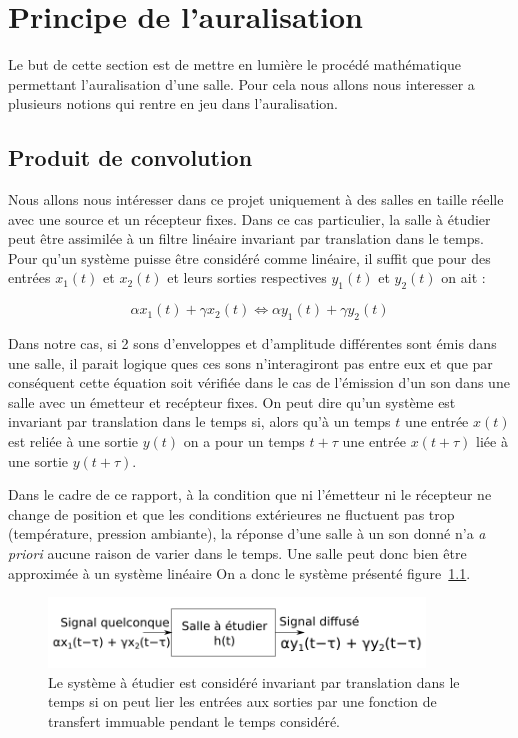\chapter{Principe de l'auralisation}

Le but de cette section est de mettre en lumière le procédé mathématique permettant l'auralisation d'une salle. Pour cela nous allons nous interesser a plusieurs notions qui rentre en jeu dans l'auralisation.

\section{Produit de convolution} %
\label{produit_de_convo}

Nous allons nous intéresser dans ce projet uniquement à des salles en taille réelle avec une source et un récepteur fixes. Dans ce cas particulier, la salle à étudier peut être assimilée à un filtre linéaire invariant par translation dans le temps. 
Pour qu'un système puisse être considéré comme linéaire, il suffit que pour des entrées $x_1(t)$ et $x_2(t)$ et leurs sorties respectives $y_1(t)$ et $y_2(t)$ on ait :
    
\begin{equation}
    \alpha x_1(t) + \gamma x_2(t) \Leftrightarrow \alpha y_1(t) + \gamma y_2(t)
\end{equation}

Dans notre cas, si 2 sons d'enveloppes et d'amplitude différentes sont émis dans une salle, il parait logique ques ces sons n'interagiront pas entre eux et que par conséquent cette équation soit vérifiée dans le cas de l'émission d'un son dans une salle avec un émetteur et recépteur fixes.
On peut dire qu'un système est invariant par translation dans le temps si, alors qu'à un temps $t$ une entrée $x(t)$ est reliée à une sortie $y(t)$ on a pour un temps $t+\tau$ une entrée $x(t+\tau)$ liée à une sortie $y(t+\tau)$.

Dans le cadre de ce rapport, à la condition que ni l'émetteur ni le récepteur ne change de position et que les conditions extérieures ne fluctuent pas trop (température, pression ambiante), la réponse d'une salle à un son donné n'a \textit{a priori} aucune raison de varier dans le temps.
Une salle peut donc bien être approximée à un système linéaire
On a donc le système présenté figure~\ref{systeme_lineaire_invariant}.

\begin{figure}[h!]
\begin{center}
\includegraphics[width=10cm]{systeme_lineaire_invariant.png}
\end{center}
\caption{\label{systeme_lineaire_invariant}Le système à étudier est considéré invariant par translation dans le temps si on peut lier les entrées aux sorties par une fonction de transfert immuable pendant le temps considéré.}
\end{figure}


